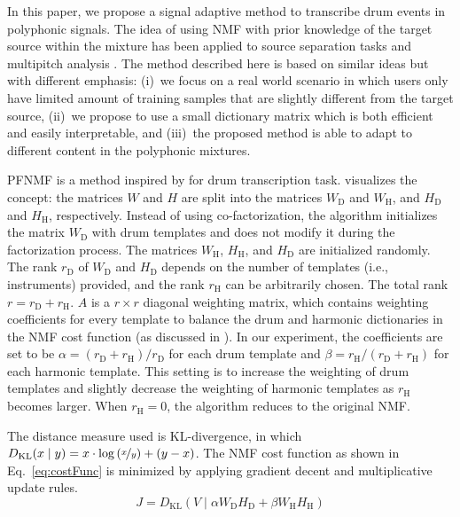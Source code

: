 \documentclass{article}
\begin{document}
In this paper, %
we propose a signal adaptive method to transcribe drum events in polyphonic signals. The idea of using NMF with prior knowledge of the target source within the mixture has been applied to source separation tasks \cite{smaragdis_ssnmf_2007} and multipitch analysis \cite{raczynski_Hnmf_2007}. The method described here is based on similar ideas but with different emphasis: 
(i)~we focus on a real world scenario in which users only have limited amount of training samples that are slightly different from the target source, 
(ii)~we propose to use a small dictionary matrix which is both efficient and easily interpretable, and
(iii)~the proposed method is able to adapt to different content in the polyphonic mixtures.

PFNMF\cite{Wu2015} is a method inspired by \cite{yoo_nonnegative_2010} for drum transcription task.  visualizes the concept: the matrices $W$ and $H$ are split into the  matrices $W_\mathrm{D}$ and $W_\mathrm{H}$, and  $H_\mathrm{D}$ and $H_\mathrm{H}$, respectively. Instead of using co-factorization, the algorithm initializes the matrix $W_\mathrm{D}$ with drum templates and does not modify it during the factorization process. The matrices $W_\mathrm{H}$, $H_\mathrm{H}$, and $H_\mathrm{D}$ are initialized randomly. The rank $r_\mathrm{D}$ of $W_\mathrm{D}$ and $H_\mathrm{D}$ depends on the number of templates (i.e., instruments) provided, and the rank $r_\mathrm{H}$ can be arbitrarily chosen. The total rank $r = r_\mathrm{D} + r_\mathrm{H}$. $A$ is a $r \times r$ diagonal weighting matrix, which contains weighting coefficients for every template to balance the drum and harmonic dictionaries in the NMF cost function (as discussed in ). In our experiment, the coefficients are set to be $\alpha = (r_\mathrm{D} + r_\mathrm{H})/ r_\mathrm{D}$ for each drum template and $\beta = r_\mathrm{H}/ (r_\mathrm{D} + r_\mathrm{H})$ for each harmonic template. This setting is to increase the weighting of drum templates and slightly decrease the weighting of harmonic templates as $r_\mathrm{H}$ becomes larger. When $r_\mathrm{H} = 0$, the algorithm reduces to the original NMF.

The distance measure used is KL-divergence, in which \(D_\mathrm{KL}(x \mid y) = x\cdot\log\left(\nicefrac{x}{y}\right) + (y - x)\). %
The NMF cost function as shown in Eq.~\eqref{eq:costFunc} is minimized by applying gradient decent and multiplicative update rules. 
\begin{equation}
\label{eq:costFunc}
J = D_\mathrm{KL}(V \mid \alpha W_\mathrm{D}H_\mathrm{D} + \beta W_\mathrm{H}H_\mathrm{H})
\end{equation}
\end{document}
